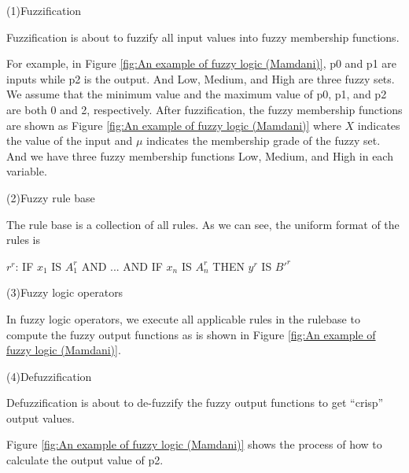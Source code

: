 \documentclass[journal,a4paper,onecolumn]{article}
\newcommand{\comR}[1]{\textcolor{red}{\emph{#1}}}
\begin{document}



(1)Fuzzification

Fuzzification is about to fuzzify all input values into fuzzy membership functions. 

For example, in Figure \ref{fig:An example of fuzzy logic (Mamdani)}, p0 and p1 are inputs while p2 is the output. And Low, Medium, and High are three fuzzy sets. We assume that the minimum value and the maximum value of p0, p1, and p2 are both 0 and 2, respectively. After fuzzification, the fuzzy membership functions are shown as Figure \ref{fig:An example of fuzzy logic (Mamdani)} where $X$ indicates the value of the input and $\mu$ indicates the membership grade of the fuzzy set. And we have three fuzzy membership functions Low, Medium, and High in each variable.

(2)Fuzzy rule base

The rule base is a collection of all rules. As we can see, the uniform format of the rules is
\begin{center}
$r^r$: IF $x_1$ IS $A^r_1$ AND ... AND IF $x_n$ IS $A^r_n$ THEN $y^r$ IS ${B'}^r$
\end{center}

(3)Fuzzy logic operators

In fuzzy logic operators, we execute all applicable rules in the rulebase to compute the fuzzy output functions as is shown in Figure \ref{fig:An example of fuzzy logic (Mamdani)}.

(4)Defuzzification

Defuzzification is about to de-fuzzify the fuzzy output functions to get ``crisp'' output values.
 
Figure \ref{fig:An example of fuzzy logic (Mamdani)} shows the process of how to calculate the output value of p2.

\clearpage
\end{document}
